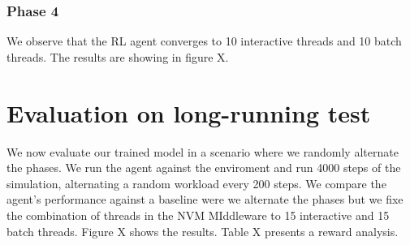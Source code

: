 \subsubsection*{Phase 4}
We observe that the RL agent converges to 10 interactive threads and 10 batch threads. The results are showing in figure X.

\section{Evaluation on long-running test}
We now evaluate our trained model in a scenario where we randomly alternate the phases. We run the agent against the enviroment and run 4000 steps of the simulation, alternating a random workload every 200 steps. We compare the agent's performance against a baseline were we alternate the phases but we fixe the combination of threads in the NVM MIddleware to 15 interactive and 15 batch threads. Figure X shows the results. Table X presents a reward analysis.
